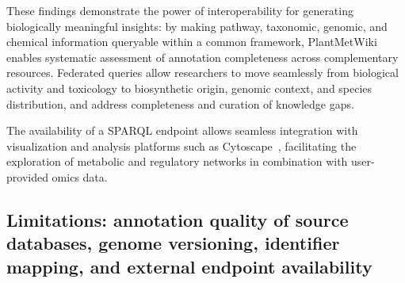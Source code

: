 \documentclass[11pt,a4paper]{article}
\begin{document}
These findings demonstrate the power of interoperability for generating biologically meaningful
insights: by making pathway, taxonomic, genomic, and chemical information queryable within a common
framework, PlantMetWiki enables systematic assessment of annotation completeness across
complementary resources. Federated queries allow researchers to move seamlessly from biological
activity and toxicology to biosynthetic origin, genomic context, and species distribution, and
address completeness and curation of knowledge gaps.

The availability of a SPARQL endpoint allows seamless integration with visualization and
analysis platforms such as Cytoscape~\cite{shannon2003}, facilitating the exploration of metabolic and
regulatory networks in combination with user-provided omics data.

\subsection*{Limitations: annotation quality of source databases, genome versioning, identifier mapping, and external endpoint availability}
\end{document}
